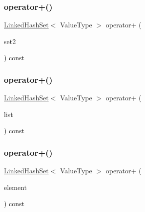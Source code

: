 \mbox{\label{classLinkedHashSet_a186c80b6e63711deeff5824b19ec1f9b}} 
\subsubsection{\texorpdfstring{operator+()}{operator+()}\hspace{0.1cm}{\footnotesize\ttfamily [1/3]}}
{\footnotesize\ttfamily \mbox{\hyperlink{classLinkedHashSet}{Linked\+Hash\+Set}}$<$ Value\+Type $>$ operator+ (\begin{DoxyParamCaption}\item[{const \mbox{\hyperlink{classLinkedHashSet}{Linked\+Hash\+Set}}$<$ Value\+Type $>$ \&}]{set2 }\end{DoxyParamCaption}) const}

\mbox{\label{classLinkedHashSet_a844d11fefcbce2c32987250561006c0b}} 
\subsubsection{\texorpdfstring{operator+()}{operator+()}\hspace{0.1cm}{\footnotesize\ttfamily [2/3]}}
{\footnotesize\ttfamily \mbox{\hyperlink{classLinkedHashSet}{Linked\+Hash\+Set}}$<$ Value\+Type $>$ operator+ (\begin{DoxyParamCaption}\item[{std\+::initializer\+\_\+list$<$ Value\+Type $>$}]{list }\end{DoxyParamCaption}) const}

\mbox{\label{classLinkedHashSet_a47b1f81356522a5d84a26f97644a01c0}} 
\subsubsection{\texorpdfstring{operator+()}{operator+()}\hspace{0.1cm}{\footnotesize\ttfamily [3/3]}}
{\footnotesize\ttfamily \mbox{\hyperlink{classLinkedHashSet}{Linked\+Hash\+Set}}$<$ Value\+Type $>$ operator+ (\begin{DoxyParamCaption}\item[{const Value\+Type \&}]{element }\end{DoxyParamCaption}) const}

